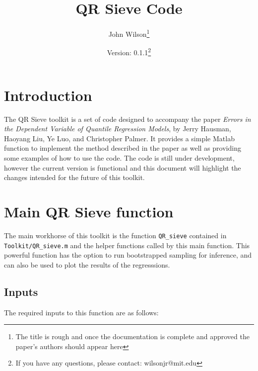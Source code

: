 \documentclass[12pt]{article}
\title{QR Sieve Code}
\author{John Wilson\footnote{The title is rough and once the documentation is complete and approved the paper's authors should appear here}}
\date{Version: 0.1.1\footnote{If you have any questions, please contact: wilsonjr@mit.edu}}
\begin{document}
\nocite{*}
\maketitle

\tableofcontents

\newpage

\section{Introduction}

The QR Sieve toolkit is a set of code designed to accompany the paper \textit{Errors in the Dependent Variable of Quantile Regression Models}, by Jerry Hausman, Haoyang Liu, Ye Luo, and Christopher Palmer. It provides a simple Matlab function to implement the method described in the paper as well as providing some examples of how to use the code. The code is still under development, however the current version is functional and this document will highlight the changes intended for the future of this toolkit.

\section{Main QR Sieve function}

The main workhorse of this toolkit is the function \lstinline{QR_sieve} contained in \lstinline{Toolkit/QR_sieve.m} and the helper functions called by this main function. This powerful function has the option to run bootstrapped sampling for inference, and can also be used to plot the results of the regresssions.

\subsection{Inputs}

The required inputs to this function are as follows:
\end{document}
